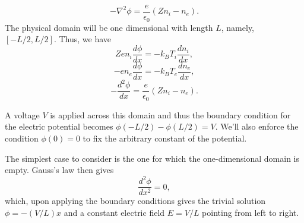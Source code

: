 \documentclass[a4paper,11pt]{report}
\begin{document}
\begin{equation*}
    -\nabla^2 \phi = \frac{e}{\epsilon_0} (Zn_i - n_e).
\end{equation*}
The physical domain will be one dimensional with length $L$, namely, $[-L/2,L/2]$. Thus, we have
\begin{equation}
    \label{eq:debye_ode_ni}
    Zen_i \frac{d\phi}{dx} = -k_B T_i \frac{dn_i}{dx},
\end{equation}
\begin{equation}
    \label{eq:debye_ode_ne}
    -en_e \frac{d\phi}{dx} = -k_B T_e \frac{dn_e}{dx},
\end{equation}
\begin{equation}
    \label{eq:debye_ode_phi}
    -\frac{d^2\phi}{dx} = \frac{e}{\epsilon_0} (Zn_i - n_e).
\end{equation}

A voltage $V$ is applied across this domain and thus the boundary condition for the electric potential becomes $\phi(-L/2) - \phi(L/2) = V$. We'll also enforce the condition $\phi(0) = 0$ to fix the arbitrary constant of the potential. 

The simplest case to consider is the one for which the one-dimensional domain is empty. Gauss's law then gives
\begin{equation*}
    \frac{d^2 \phi}{dx^2} = 0,
\end{equation*}
which, upon applying the boundary conditions gives the trivial solution $\phi = -(V/L) x$ and a constant electric field $E=V/L$ pointing from left to right.
\end{document}
